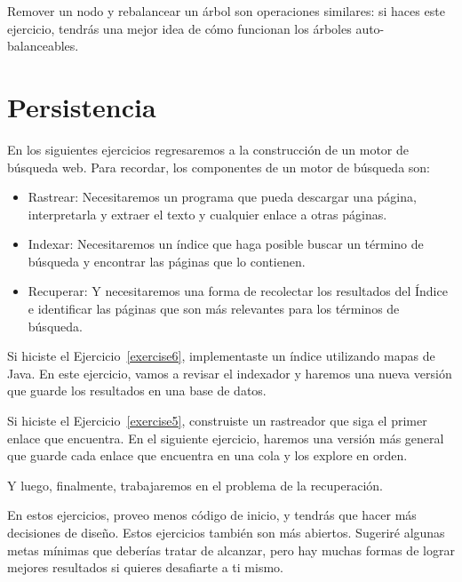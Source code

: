 \documentclass[12pt]{book}
\theoremstyle{exercise}
\begin{document}

Remover un nodo y rebalancear un árbol son operaciones similares: si haces
este ejercicio, tendrás una mejor idea de cómo funcionan los árboles
auto-balanceables.



\chapter{Persistencia}

En los siguientes ejercicios regresaremos a la construcción de un motor
de búsqueda web. Para recordar, los componentes de un motor de búsqueda son:

\begin{itemize}

  \item
  Rastrear: Necesitaremos un programa que pueda descargar una página, interpretarla
  y extraer el texto y cualquier enlace a otras páginas.

  \item
  Indexar: Necesitaremos un índice que haga posible buscar un término
  de búsqueda y encontrar las páginas que lo contienen.

  \item
  Recuperar: Y necesitaremos una forma de recolectar los resultados del Índice e identificar
  las páginas que son más relevantes para los términos de búsqueda.

\end{itemize}


Si hiciste el Ejercicio~\ref{exercise6}, implementaste un índice utilizando
mapas de Java. En este ejercicio, vamos a revisar el indexador y haremos
una nueva versión que guarde los resultados en una base de datos.


Si hiciste el Ejercicio~\ref{exercise5}, construiste un rastreador
que siga el primer enlace que encuentra. En el siguiente ejercicio,
haremos una versión más general que guarde cada enlace que encuentra
en una cola y los explore en orden.

Y luego, finalmente, trabajaremos en el problema de la recuperación.

En estos ejercicios, proveo menos código de inicio, y tendrás que hacer
más decisiones de diseño. Estos ejercicios también son más abiertos. Sugeriré
algunas metas mínimas que deberías tratar de alcanzar, pero hay muchas formas
de lograr mejores resultados si quieres desafiarte a ti mismo.
\end{document}
